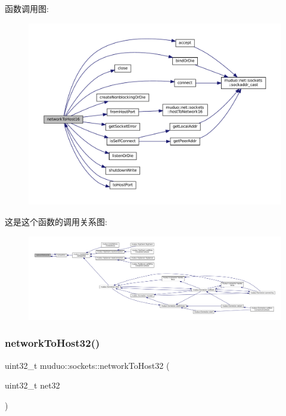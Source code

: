 函数调用图\+:
\nopagebreak
\begin{figure}[H]
\begin{center}
\leavevmode
\includegraphics[width=350pt]{namespacemuduo_1_1sockets_aeeb31294e44fee5ecfc4b32f420f6d5d_cgraph}
\end{center}
\end{figure}
这是这个函数的调用关系图\+:
\nopagebreak
\begin{figure}[H]
\begin{center}
\leavevmode
\includegraphics[width=350pt]{namespacemuduo_1_1sockets_aeeb31294e44fee5ecfc4b32f420f6d5d_icgraph}
\end{center}
\end{figure}
\mbox{\label{namespacemuduo_1_1sockets_a5846c926ef43813d8b8440b6b3a43633}} 
\subsubsection{\texorpdfstring{network\+To\+Host32()}{networkToHost32()}}
{\footnotesize\ttfamily uint32\+\_\+t muduo\+::sockets\+::network\+To\+Host32 (\begin{DoxyParamCaption}\item[{uint32\+\_\+t}]{net32 }\end{DoxyParamCaption})\hspace{0.3cm}{\ttfamily [inline]}}



